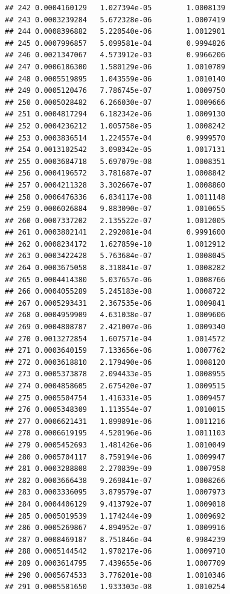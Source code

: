 \documentclass{article}\usepackage[]{graphicx}\usepackage[]{xcolor}
\makeatletter
\newenvironment{kframe}{%
 \def\at@end@of@kframe{}%
 \ifinner\ifhmode%
  \def\at@end@of@kframe{\end{minipage}}%
  \begin{minipage}{\columnwidth}%
 \fi\fi%
 \def\FrameCommand##1{\hskip\@totalleftmargin \hskip-\fboxsep
 \colorbox{shadecolor}{##1}\hskip-\fboxsep
     \hskip-\linewidth \hskip-\@totalleftmargin \hskip\columnwidth}%
 \MakeFramed {\advance\hsize-\width
   \@totalleftmargin\z@ \linewidth\hsize
   \@setminipage}}%
 {\par\unskip\endMakeFramed%
 \at@end@of@kframe}
\newenvironment{knitrout}{}{} %
\makeatother
\begin{document}
\begin{knitrout}
\begin{kframe}
\begin{verbatim}
## 242 0.0004160129   1.027394e-05        1.0008139
## 243 0.0003239284   5.672328e-06        1.0007419
## 244 0.0008396882   5.220540e-06        1.0012901
## 245 0.0007996857   5.099581e-04        0.9994826
## 246 0.0021347067   4.573912e-03        0.9966206
## 247 0.0006186300   1.580129e-06        1.0010789
## 248 0.0005519895   1.043559e-06        1.0010140
## 249 0.0005120476   7.786745e-07        1.0009750
## 250 0.0005028482   6.266030e-07        1.0009666
## 251 0.0004817294   6.182342e-06        1.0009130
## 252 0.0004236212   1.005758e-05        1.0008242
## 253 0.0003836514   1.224557e-04        0.9999570
## 254 0.0013102542   3.098342e-05        1.0017131
## 255 0.0003684718   5.697079e-08        1.0008351
## 256 0.0004196572   3.781687e-07        1.0008842
## 257 0.0004211328   3.302667e-07        1.0008860
## 258 0.0006476336   6.834117e-08        1.0011148
## 259 0.0006026884   9.883090e-07        1.0010655
## 260 0.0007337202   2.135522e-07        1.0012005
## 261 0.0003802141   2.292081e-04        0.9991600
## 262 0.0008234172   1.627859e-10        1.0012912
## 263 0.0003422428   5.763684e-07        1.0008045
## 264 0.0003675058   8.318841e-07        1.0008282
## 265 0.0004414380   5.037657e-06        1.0008766
## 266 0.0004055289   5.245183e-08        1.0008722
## 267 0.0005293431   2.367535e-06        1.0009841
## 268 0.0004959909   4.631038e-07        1.0009606
## 269 0.0004808787   2.421007e-06        1.0009340
## 270 0.0013272854   1.607571e-04        1.0014572
## 271 0.0003640159   7.133656e-06        1.0007762
## 272 0.0003618810   2.179490e-06        1.0008120
## 273 0.0005373878   2.094433e-05        1.0008955
## 274 0.0004858605   2.675420e-07        1.0009515
## 275 0.0005504754   1.416331e-05        1.0009457
## 276 0.0005348309   1.113554e-07        1.0010015
## 277 0.0006621431   1.899891e-06        1.0011216
## 278 0.0006619195   4.520196e-06        1.0011103
## 279 0.0005452693   1.481426e-06        1.0010049
## 280 0.0005704117   8.759194e-06        1.0009947
## 281 0.0003288808   2.270839e-09        1.0007958
## 282 0.0003666438   9.269841e-07        1.0008266
## 283 0.0003336095   3.879579e-07        1.0007973
## 284 0.0004406129   9.413792e-07        1.0009018
## 285 0.0005019539   1.174244e-09        1.0009692
## 286 0.0005269867   4.894952e-07        1.0009916
## 287 0.0008469187   8.751846e-04        0.9984239
## 288 0.0005144542   1.970217e-06        1.0009710
## 289 0.0003614795   7.439655e-06        1.0007709
## 290 0.0005674533   3.776201e-08        1.0010346
## 291 0.0005581650   1.933303e-08        1.0010254

\end{verbatim}
\end{kframe}
\end{knitrout}
\end{document}

